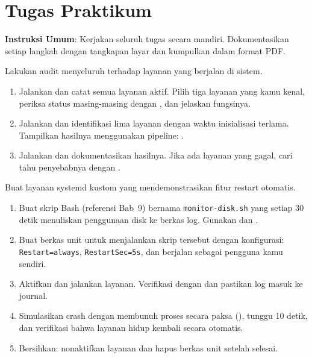 \section{Tugas Praktikum}
\label{sec:service-exercises}

\textbf{Instruksi Umum}: Kerjakan seluruh tugas secara mandiri. Dokumentasikan setiap langkah dengan tangkapan layar dan kumpulkan dalam format PDF.

\begin{exercisebox}
Lakukan audit menyeluruh terhadap layanan yang berjalan di sistem.
\begin{enumerate}
    \item Jalankan  dan catat semua layanan aktif. Pilih tiga layanan yang kamu kenal, periksa status masing-masing dengan , dan jelaskan fungsinya.
    \item Jalankan  dan identifikasi lima layanan dengan waktu inisialisasi terlama. Tampilkan hasilnya menggunakan pipeline: .
    \item Jalankan  dan dokumentasikan hasilnya. Jika ada layanan yang gagal, cari tahu penyebabnya dengan .
\end{enumerate}
\end{exercisebox}

\begin{exercisebox}
Buat layanan systemd kustom yang mendemonstrasikan fitur restart otomatis.
\begin{enumerate}
    \item Buat skrip Bash (referensi Bab~9) bernama \texttt{monitor-disk.sh} yang setiap 30 detik menuliskan penggunaan disk ke berkas log. Gunakan  dan .
    \item Buat berkas unit  untuk menjalankan skrip tersebut dengan konfigurasi: \texttt{Restart=always}, \texttt{RestartSec=5s}, dan berjalan sebagai pengguna kamu sendiri.
    \item Aktifkan dan jalankan layanan. Verifikasi dengan  dan pastikan log masuk ke journal.
    \item Simulasikan crash dengan membunuh proses secara paksa (), tunggu 10 detik, dan verifikasi bahwa layanan hidup kembali secara otomatis.
    \item Bersihkan: nonaktifkan layanan dan hapus berkas unit setelah selesai.
\end{enumerate}
\end{exercisebox}

